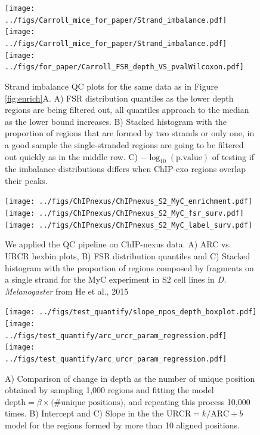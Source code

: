 \documentclass{bmcart}\usepackage[]{graphicx}\usepackage[]{color}
\begin{document}
\newpage

\begin{figure}[h!]
  \centering  
  \texttt{[image: ../figs/Carroll\_mice\_for\_paper/Strand\_imbalance.pdf]} 
  \newline
  \texttt{[image: ../figs/Carroll\_mice\_for\_paper/Strand\_imbalance.pdf]} 
  \texttt{[image: ../figs/for\_paper/Carroll\_FSR\_depth\_VS\_pvalWilcoxon.pdf]}
  \caption{Strand imbalance QC plots for the same data as in Figure
    \ref{fig:enrich}A. A) FSR distribution quantiles as the lower
    depth regions are being filtered out, all quantiles approach to
    the median as the lower bound increases. B) Stacked histogram with
    the proportion of regions that are formed by two strands or only
    one, in a good sample the single-stranded regions are going to be
    filtered out quickly as in the middle row. C)
    $-\log_{10}(\text{p.value})$ of testing if the imbalance
    distributions differs when ChIP-exo regions overlap their peaks.}
  \label{fig:strand}
\end{figure}

\newpage

\begin{figure}[h!]
  \centering
  \texttt{[image: ../figs/ChIPnexus/ChIPnexus\_S2\_MyC\_enrichment.pdf]}
\newline
  \texttt{[image: ../figs/ChIPnexus/ChIPnexus\_S2\_MyC\_fsr\_surv.pdf]}  
  \texttt{[image: ../figs/ChIPnexus/ChIPnexus\_S2\_MyC\_label\_surv.pdf]}  
  \caption{We applied the QC pipeline on ChIP-nexus data. A) ARC
    vs. URCR hexbin plots, B) FSR distribution quantiles and C)
    Stacked histogram with the proportion of regions composed by
    fragments on a single strand for the MyC experiment in S2 cell
    lines in \emph{D. Melanogaster} from He et al., 2015
    \cite{chipnexus}}
  \label{fig:nexus}
\end{figure}

\newpage


\begin{figure}[h!]
  \centering
  \texttt{[image: ../figs/test\_quantify/slope\_npos\_depth\_boxplot.pdf]}
  \texttt{[image: ../figs/test\_quantify/arc\_urcr\_param\_regression.pdf]}
  \texttt{[image: ../figs/test\_quantify/arc\_urcr\_param\_regression.pdf]}
  \caption{A) Comparison of change in depth as the number of unique
    position obtained by sampling 1,000 regions and fitting
    the model $\mbox{depth} = \beta \times \text{(\# unique
      positions)}$, and repeating this process 10,000 times. B)
    Intercept and C) Slope in the the $\mbox{URCR} = k / \mbox{ARC} +
    b$ model for the regions formed by more than 10 aligned
    positions.}
  \label{fig:enrich_all}
\end{figure}
\end{document}

